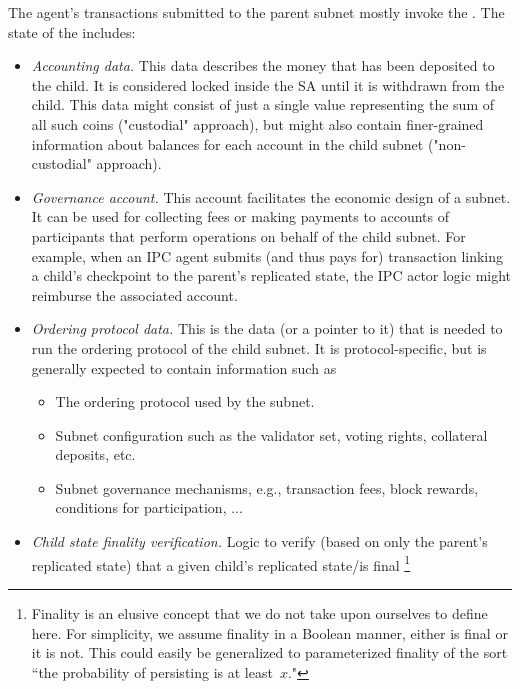 \begin{itemize}
\begin{enumerate}
            The \ipc agent's transactions submitted to the parent subnet mostly invoke the \sa.
            The state of the \sa includes:
            \begin{itemize}
            \item \emph{Accounting data.}
            This data describes the money that has been deposited to the child.
            It is considered locked inside the SA until it is withdrawn from the child.
            This data might consist of just a single value representing the sum of all such coins ("custodial" approach),
            but might also contain finer-grained information about balances for each account in the child subnet ("non-custodial" approach).
            \item \emph{Governance account.}
            This account facilitates the economic design of a subnet.
            It can be used for collecting fees or making payments to accounts of participants that perform operations on behalf of the child subnet.
            For example, when an IPC agent submits (and thus pays for) transaction linking a child's checkpoint to the parent's replicated state,
            the IPC actor logic might reimburse the associated account.
            \item \emph{Ordering protocol data.}
            This is the data (or a pointer to it) that is needed to run the ordering protocol of the child subnet.
            It is protocol-specific, but is generally expected to contain information such as
            \begin{itemize}
                \item The ordering protocol used by the subnet.
                \item Subnet configuration such as the validator set, voting rights, collateral deposits, etc.
                \item Subnet governance mechanisms, e.g., transaction fees, block rewards, conditions for participation, ...
            \end{itemize}
            \item \emph{Child state finality verification.} Logic to verify (based on only the parent's replicated state)
            that a given child's replicated state/\tx is final%
\footnote{Finality is an elusive concept that we do not take upon ourselves to define here. For simplicity, we assume finality in a Boolean manner, either \tx is final or it is not. This could easily be generalized to parameterized finality of the sort ``the probability of \tx persisting is at least~$x$."}

\end{itemize}
\end{enumerate}
\end{itemize}
